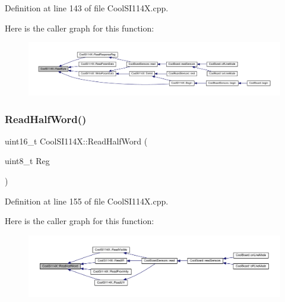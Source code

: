 Definition at line 143 of file Cool\+S\+I114\+X.\+cpp.

Here is the caller graph for this function\+:
\nopagebreak
\begin{figure}[H]
\begin{center}
\leavevmode
\includegraphics[width=350pt]{class_cool_s_i114_x_acc20f8037e156ec4aadcbe90780b1e8b_icgraph}
\end{center}
\end{figure}
\mbox{\label{class_cool_s_i114_x_a1d25c9e137874af529804c2ec796a6b9}} 
\subsubsection{\texorpdfstring{Read\+Half\+Word()}{ReadHalfWord()}}
{\footnotesize\ttfamily uint16\+\_\+t Cool\+S\+I114\+X\+::\+Read\+Half\+Word (\begin{DoxyParamCaption}\item[{uint8\+\_\+t}]{Reg }\end{DoxyParamCaption})\hspace{0.3cm}{\ttfamily [private]}}



Definition at line 155 of file Cool\+S\+I114\+X.\+cpp.

Here is the caller graph for this function\+:
\nopagebreak
\begin{figure}[H]
\begin{center}
\leavevmode
\includegraphics[width=350pt]{class_cool_s_i114_x_a1d25c9e137874af529804c2ec796a6b9_icgraph}
\end{center}
\end{figure}
\mbox{\label{class_cool_s_i114_x_abc536ee7ae8e3ba9d1069acc3889a2cf}} 
